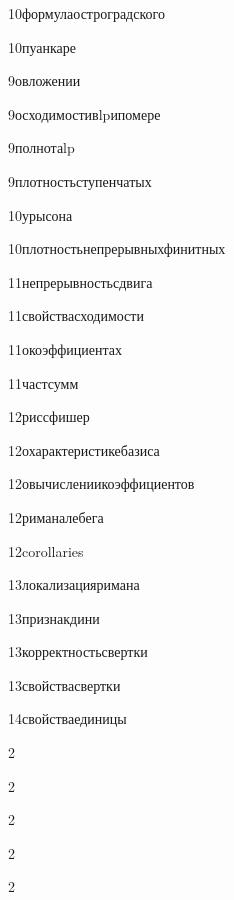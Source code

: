 {10}{формулаостроградского}

{10}{пуанкаре}

{9}{овложении}

{9}{осходимостивlpипомере}

{9}{полнотаlp}

{9}{плотностьступенчатых}

{10}{урысона}

{10}{плотностьнепрерывныхфинитных}

{11}{непрерывностьсдвига}

{11}{свойствасходимости}

{11}{окоэффициентах}

{11}{частсумм}

{12}{риссфишер}

{12}{охарактеристикебазиса}

{12}{овычислениикоэффициентов}

{12}{риманалебега}

{12}{corollaries}

{13}{локализацияримана}

{13}{признакдини}

{13}{корректностьсвертки}

{13}{свойствасвертки}

{14}{свойстваединицы}

{2}{}

{2}{}

{2}{}

{2}{}

{2}{}


